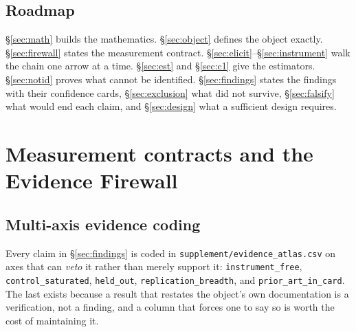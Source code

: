 \subsection{Roadmap}

§\ref{sec:math} builds the mathematics. §\ref{sec:object} defines the object
exactly. §\ref{sec:firewall} states the measurement contract.
§\ref{sec:elicit}--§\ref{sec:instrument} walk the chain one arrow at a time.
§\ref{sec:est} and §\ref{sec:c1} give the estimators. §\ref{sec:notid} proves
what cannot be identified. §\ref{sec:findings} states the findings with their
confidence cards, §\ref{sec:exclusion} what did not survive,
§\ref{sec:falsify} what would end each claim, and §\ref{sec:design} what a
sufficient design requires.









\section{Measurement contracts and the Evidence Firewall}


\subsection{Multi-axis evidence coding}

Every claim in §\ref{sec:findings} is coded in
\texttt{supplement/evidence\_atlas.csv} on axes that can \emph{veto} it rather
than merely support it: \texttt{instrument\_free}, \texttt{control\_saturated},
\texttt{held\_out}, \texttt{replication\_breadth}, and \texttt{prior\_art\_in\_card}.
The last exists because a result that restates the object's own documentation is
a verification, not a finding, and a column that forces one to say so is worth
the cost of maintaining it.








